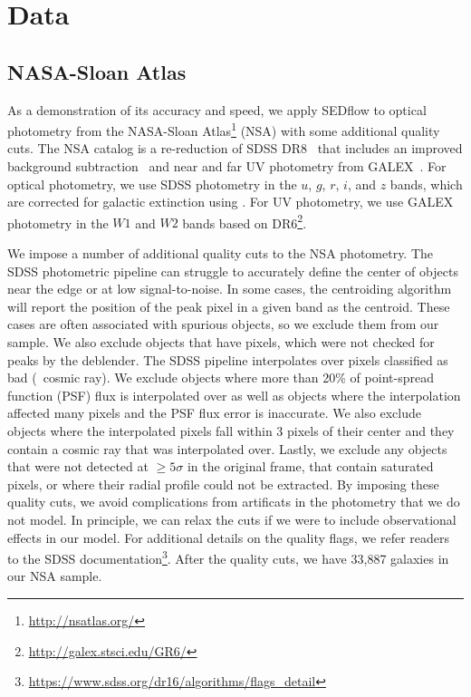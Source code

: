 \section{Data}
\subsection{NASA-Sloan Atlas} \label{sec:obs}
As a demonstration of its accuracy and speed, we apply {\sc SEDflow} to 
optical photometry from the NASA-Sloan
Atlas\footnote{\url{http://nsatlas.org/}} (NSA) with some additional quality
cuts.
The NSA catalog is a re-reduction of SDSS DR8~\citep{aihara2011} that includes
an improved background subtraction~\citep{blanton2011} and near and far UV
photometry from GALEX~\citep{}.
For optical photometry, we use SDSS photometry in the $u$, $g$, $r$, $i$, and
$z$ bands, which are corrected for galactic extinction using \cite{schlegel1997}.
For UV photometry, we use GALEX photometry in the $W1$ and $W2$ bands
based on DR6\footnote{\url{http://galex.stsci.edu/GR6/}}.

We impose a number of additional quality cuts to the NSA photometry.
The SDSS photometric pipeline can struggle to accurately define the center
of objects near the edge or at low signal-to-noise. 
In some cases, the centroiding algorithm will report the position of the peak
pixel in a given band as the centroid. 
These cases are often associated with spurious objects, so we exclude them
from our sample. 
We also exclude objects that have pixels, which were not checked for peaks
by the deblender. %
The SDSS pipeline interpolates over pixels classified as bad (\eg~cosmic ray).
We exclude objects where more than 20\% of point-spread function (PSF) flux is
interpolated over as well as objects where the interpolation affected many
pixels and the PSF flux error is inaccurate. 
We also exclude objects where the interpolated pixels fall within 3 pixels of
their center and they contain a cosmic ray that was interpolated over.
Lastly, we exclude any objects that were not detected at $\ge5\sigma$ in the
original frame, that contain saturated pixels, or where their radial profile 
could not be extracted.
By imposing these quality cuts, we avoid complications from artificats in the
photometry that we do not model. 
In principle, we can relax the cuts if we were to include observational effects
in our model.
For additional details on the quality flags, we refer readers to the SDSS
documentation\footnote{\url{https://www.sdss.org/dr16/algorithms/flags_detail}}.
After the quality cuts, we have 33,887 galaxies in our NSA sample.

